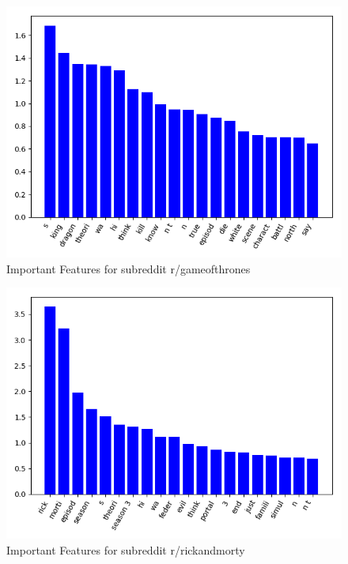 \documentclass{sig-alternate-05-2015}
\begin{document}
\begin{figure}[H]
\centering
\includegraphics[width=\linewidth]{plots/coefficients-gameofthrones-dim-337.png}
\caption{Important Features for subreddit r/gameofthrones}
\end{figure}

\begin{figure}[H]
\centering
\includegraphics[width=\linewidth]{plots/coefficients-rickandmorty-dim-713.png}
\caption{Important Features for subreddit r/rickandmorty}
\end{figure}
\end{document}
